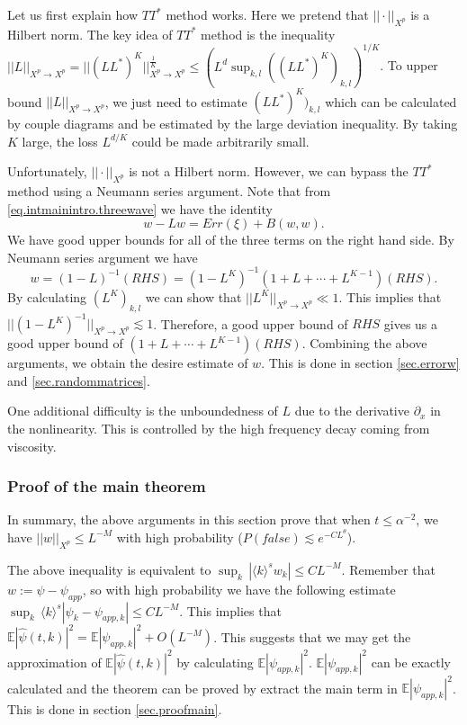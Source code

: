 Let us first explain how $TT^*$ method works. Here we pretend that $||\cdot||_{X^p}$ is a Hilbert norm. The key idea of $TT^*$ method is the inequality $||L||_{X^p\rightarrow X^p}=||(LL^*)^K||_{X^p\rightarrow X^p}^{\frac{1}{K}}\le (L^d\sup_{k,l} ((LL^*)^K)_{k,l})^{1/K}$. To upper bound $||L||_{X^p\rightarrow X^p}$, we just need to estimate $(LL^*)^K)_{k,l}$ which can be calculated by couple diagrams and be estimated by the large deviation inequality. By taking $K$ large, the loss $L^{d/K}$ could be made arbitrarily small.

Unfortunately, $||\cdot||_{X^p}$ is not a Hilbert norm. However, we can bypass the $TT^*$ method using a Neumann series argument. Note that from \eqref{eq.intmainintro.threewave} we have the identity
\begin{equation}
    w-Lw= Err(\xi)+B(w,w).
\end{equation}
We have good upper bounds for all of the three terms on the right hand side. By Neumann series argument we have
\begin{equation}
    w= (1-L)^{-1}(\textit{RHS}) =(1-L^K)^{-1}(1+L+\cdots+L^{K-1})(\textit{RHS}).
\end{equation}
By calculating $(L^K)_{k,l}$ we can show that $||L^K||_{X^p\rightarrow X^p}\ll 1$. This implies that $||(1-L^K)^{-1}||_{X^p\rightarrow X^p}\lesssim 1$. Therefore, a good upper bound of $\textit{RHS}$ gives us a good upper bound of $(1+L+\cdots+L^{K-1})(\textit{RHS})$. Combining the above arguments, we obtain the desire estimate of $w$. This is done in section \ref{sec.errorw} and \ref{sec.randommatrices}.

One additional difficulty is the unboundedness of $L$ due to the derivative $\partial_x$ in the nonlinearity. This is controlled by the high frequency decay coming from viscosity.

\subsubsection{Proof of the main theorem} In summary, the above arguments in this section prove that when $t\le \alpha^{-2}$, we have $||w||_{X^p}\le L^{-M}$ with high probability ($P(\textit{false})\lesssim e^{-CL^{\theta}}$).   


The above inequality is equivalent to $\sup_k\, |\langle k \rangle^s w_k|\le CL^{-M}$. Remember that $w:=\psi-\psi_{app}$, so with high probability we have the following estimate $\sup_k\, \langle k \rangle^s |\psi_k-\psi_{app,k}|\le CL^{-M}$. This implies that $\mathbb E |\widehat \psi(t, k)|^2=\mathbb E |\psi_{app,k}|^2+O(L^{-M})$. This suggests that we may get the approximation of $\mathbb E |\widehat \psi(t, k)|^2$ by calculating $\mathbb E |\psi_{app,k}|^2$. $\mathbb E |\psi_{app,k}|^2$ can be exactly calculated and the theorem can be proved by extract the main term in $\mathbb E |\psi_{app,k}|^2$. This is done in section \ref{sec.proofmain}.

